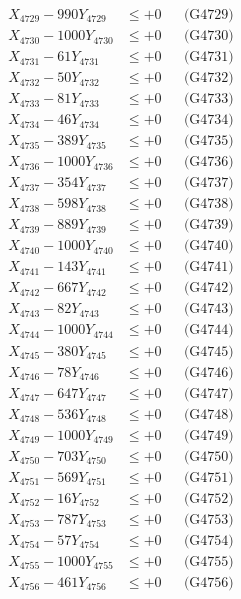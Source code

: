 \documentclass[a4paper,10pt]{article}
\begin{document}
{\begin{align}
X_{4729} - 990Y_{4729} &\leq +0 && \text{(G4729)} \\
X_{4730} - 1000Y_{4730} &\leq +0 && \text{(G4730)} \\
\allowbreak
X_{4731} - 61Y_{4731} &\leq +0 && \text{(G4731)} \\
X_{4732} - 50Y_{4732} &\leq +0 && \text{(G4732)} \\
X_{4733} - 81Y_{4733} &\leq +0 && \text{(G4733)} \\
X_{4734} - 46Y_{4734} &\leq +0 && \text{(G4734)} \\
X_{4735} - 389Y_{4735} &\leq +0 && \text{(G4735)} \\
X_{4736} - 1000Y_{4736} &\leq +0 && \text{(G4736)} \\
X_{4737} - 354Y_{4737} &\leq +0 && \text{(G4737)} \\
X_{4738} - 598Y_{4738} &\leq +0 && \text{(G4738)} \\
X_{4739} - 889Y_{4739} &\leq +0 && \text{(G4739)} \\
X_{4740} - 1000Y_{4740} &\leq +0 && \text{(G4740)} \\
\allowbreak
X_{4741} - 143Y_{4741} &\leq +0 && \text{(G4741)} \\
X_{4742} - 667Y_{4742} &\leq +0 && \text{(G4742)} \\
X_{4743} - 82Y_{4743} &\leq +0 && \text{(G4743)} \\
X_{4744} - 1000Y_{4744} &\leq +0 && \text{(G4744)} \\
X_{4745} - 380Y_{4745} &\leq +0 && \text{(G4745)} \\
X_{4746} - 78Y_{4746} &\leq +0 && \text{(G4746)} \\
X_{4747} - 647Y_{4747} &\leq +0 && \text{(G4747)} \\
X_{4748} - 536Y_{4748} &\leq +0 && \text{(G4748)} \\
X_{4749} - 1000Y_{4749} &\leq +0 && \text{(G4749)} \\
X_{4750} - 703Y_{4750} &\leq +0 && \text{(G4750)} \\
\allowbreak
X_{4751} - 569Y_{4751} &\leq +0 && \text{(G4751)} \\
X_{4752} - 16Y_{4752} &\leq +0 && \text{(G4752)} \\
X_{4753} - 787Y_{4753} &\leq +0 && \text{(G4753)} \\
X_{4754} - 57Y_{4754} &\leq +0 && \text{(G4754)} \\
X_{4755} - 1000Y_{4755} &\leq +0 && \text{(G4755)} \\
X_{4756} - 461Y_{4756} &\leq +0 && \text{(G4756)} \\

\end{align}}
\end{document}
